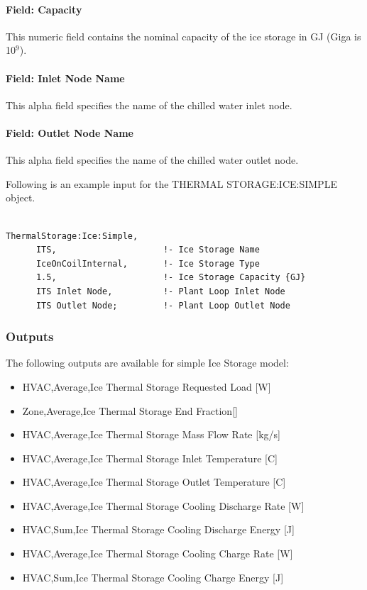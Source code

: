 \paragraph{Field: Capacity}\label{field-capacity-000}

This numeric field contains the nominal capacity of the ice storage in GJ (Giga is 10\(^{9}\)).

\paragraph{Field: Inlet Node Name}\label{field-inlet-node-name-004}

This alpha field specifies the name of the chilled water inlet node.

\paragraph{Field: Outlet Node Name}\label{field-outlet-node-name-005}

This alpha field specifies the name of the chilled water outlet node.

Following is an example input for the THERMAL STORAGE:ICE:SIMPLE object.

\begin{lstlisting}

ThermalStorage:Ice:Simple,
      ITS,                     !- Ice Storage Name
      IceOnCoilInternal,       !- Ice Storage Type
      1.5,                     !- Ice Storage Capacity {GJ}
      ITS Inlet Node,          !- Plant Loop Inlet Node
      ITS Outlet Node;         !- Plant Loop Outlet Node
\end{lstlisting}

\subsubsection{Outputs}\label{outputs-18-000}

The following outputs are available for simple Ice Storage model:

\begin{itemize}
\item
  HVAC,Average,Ice Thermal Storage Requested Load {[}W{]}
\item
  Zone,Average,Ice Thermal Storage End Fraction{[]}
\item
  HVAC,Average,Ice Thermal Storage Mass Flow Rate {[}kg/s{]}
\item
  HVAC,Average,Ice Thermal Storage Inlet Temperature {[}C{]}
\item
  HVAC,Average,Ice Thermal Storage Outlet Temperature {[}C{]}
\item
  HVAC,Average,Ice Thermal Storage Cooling Discharge Rate {[}W{]}
\item
  HVAC,Sum,Ice Thermal Storage Cooling Discharge Energy {[}J{]}
\item
  HVAC,Average,Ice Thermal Storage Cooling Charge Rate {[}W{]}
\item
  HVAC,Sum,Ice Thermal Storage Cooling Charge Energy {[}J{]}
\end{itemize}

